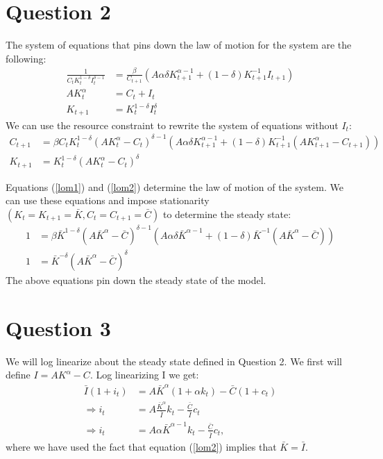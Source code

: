 \documentclass[11pt]{article} %
\begin{document}
\section{Question 2}
The system of equations that pins down the law of motion for the system are the following:
\begin{align*}
\frac{1}{C_tK_t^{1-\delta}I_t^{\delta - 1}}  &= \frac{\beta}{C_{t+1}}(A\alpha \delta K_{t+1}^{\alpha - 1} + (1-\delta)K_{t+1}^{-1}I_{t+1})\\
AK_t^{\alpha} &= C_t + I_t \\
K_{t+1} &= K_t^{1-\delta}I_t^{\delta}
\end{align*}
We can use the resource constraint to rewrite the system of equations without $I_t$:
\begin{align}
C_{t+1} &= \beta C_tK_t^{1-\delta}(AK_t^{\alpha} - C_t)^{\delta - 1}(A\alpha \delta K_{t+1}^{\alpha - 1}  + (1-\delta)K_{t+1}^{-1}(AK_{t+1}^{\alpha} - C_{t+1}) ) \label{lom1}\\
K_{t+1} &= K_t^{1-\delta}(AK_t^{\alpha} - C_t)^{\delta} \label{lom2}
\end{align}

Equations (\ref{lom1}) and (\ref{lom2}) determine the law of motion of the system. We can use these equations and impose stationarity $(K_t = K_{t+1} = \bar{K}, C_t = C_{t+1} = \bar{C})$ to determine the steady state:
\begin{align*}
1 &= \beta \bar{K}^{1-\delta}(A\bar{K}^{\alpha} - \bar{C})^{\delta - 1}(A\alpha \delta \bar{K}^{\alpha - 1} + (1 - \delta) \bar{K}^{-1}(A\bar{K}^{\alpha} - \bar{C})) \\
1 &= \bar{K}^{-\delta}(A\bar{K}^{\alpha} - \bar{C})^\delta
\end{align*}
The above equations pin down the steady state of the model.
\section{Question 3}
We will log linearize about the steady state defined in Question 2. We first will define $I = AK^{\alpha} - C.$ Log linearizing I we get:
\begin{align*}
\bar{I}(1+i_t) &= A\bar{K}^{\alpha}(1+\alpha k_t) - \bar{C}(1+c_t)\\
\Rightarrow i_t &= A\frac{\bar{K}^{\alpha}}{\bar{I}}k_t - \frac{\bar{C}}{\bar{I}}c_t \\
\Rightarrow i_t &= A\alpha\bar{K}^{\alpha - 1}k_t - \frac{\bar{C}}{\bar{I}}c_t ,
\end{align*}
where we have used the fact that equation (\ref{lom2}) implies that $\bar{K} = \bar{I}$.
\end{document}
